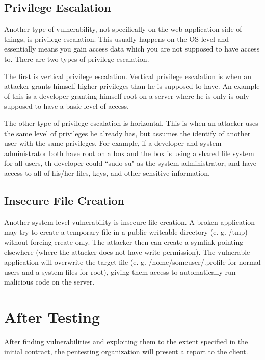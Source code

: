 \documentclass{report}
\begin{document}
\subsection*{Privilege Escalation}

Another type of vulnerability, not specifically on the web application side of
things, is privilege escalation. This usually happens on the OS level and 
essentially means you gain access data which you are not supposed to have
access to. There are two types of privilege escalation.

The first is vertical privilege escalation. Vertical privilege escalation 
is when an attacker grants himself higher privileges than he is supposed to
have. An example of this is a developer granting himself root on a server 
where he is only is only supposed to have a basic level of access.

The other type of privilege escalation is horizontal. This is when an attacker
uses the same level of privileges he already has, but assumes the identify of
another user with the same privileges. For example, if a developer and system
administrator both have root on a box and the box is using a shared file
system for all users, th developer could ``sudo su" as the system administrator,
and have access to all of his/her files, keys, and other sensitive information.

\subsection*{Insecure File Creation}

Another system level vulnerability is insecure file creation. A broken 
application may try to create a temporary file in a public writeable directory
(e. g. /tmp) without forcing create-only. The attacker then can create a 
symlink pointing elsewhere (where the attacker does not have write
permission). The vulnerable application will overwrite the target
file (e. g. /home/someuser/.profile for normal users and a system files for 
root), giving them access to automatically run malicious code on the server.

\section*{After Testing}

After finding vulnerabilities and exploiting them to the extent specified in
the initial contract, the pentesting organization will present a report to the
client. 
\end{document}
